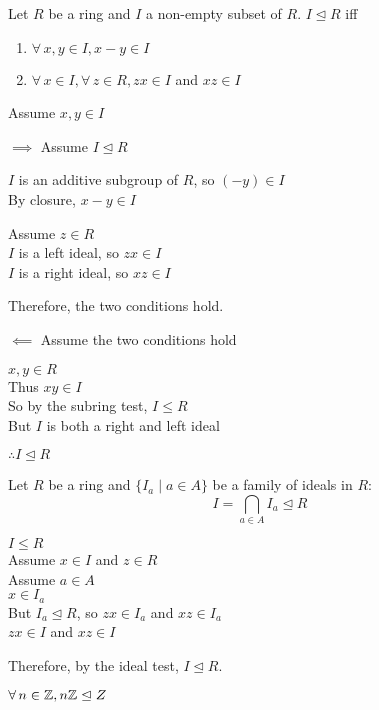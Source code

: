 \documentclass[letterpaper,12pt,fleqn]{article}
\newcommand{\ide}{\trianglelefteq}
\begin{document}
\begin{theorem}
  Let $R$ be a ring and $I$ a non-empty subset of $R$. $I\ide R$ iff
  \begin{enumerate}
  \item $\forall\,x,y\in I,x-y\in I$
  \item $\forall\,x\in I,\forall\,z\in R, zx\in I$ and $xz\in I$
  \end{enumerate}
\end{theorem}

\begin{theproof}
  Assume $x,y\in I$

  \begin{description}
  \item $\implies$ Assume $I\ide R$

    $I$ is an additive subgroup of $R$, so $(-y)\in I$ \\
    By closure, $x-y\in I$

    Assume $z\in R$ \\
    $I$ is a left ideal, so $zx\in I$ \\
    $I$ is a right ideal, so $xz\in I$

    Therefore, the two conditions hold.

  \item $\impliedby$ Assume the two conditions hold

    $x,y\in R$ \\
    Thus $xy\in I$ \\
    So by the subring test, $I\le R$ \\
    But $I$ is both a right and left ideal

    $\therefore I\ide R$
  \end{description}
\end{theproof}

\begin{theorem}
  Let $R$ be a ring and $\{I_a\mid a\in A\}$ be a family of ideals in $R$:
  \[I=\bigcap_{a\in A}I_a\ide R\]
\end{theorem}

\begin{theproof}
  $I\le R$ \\
  Assume $x\in I$ and $z\in R$ \\
  Assume $a\in A$ \\
  $x\in I_a$ \\
  But $I_a\ide R$, so $zx\in I_a$ and $xz\in I_a$ \\
  $zx\in I$ and $xz\in I$

  Therefore, by the ideal test, $I\ide R$.
\end{theproof}
\newpage
\begin{theorem}
  $\forall\,n\in\Z,n\Z\ide Z$
\end{theorem}
\end{document}

